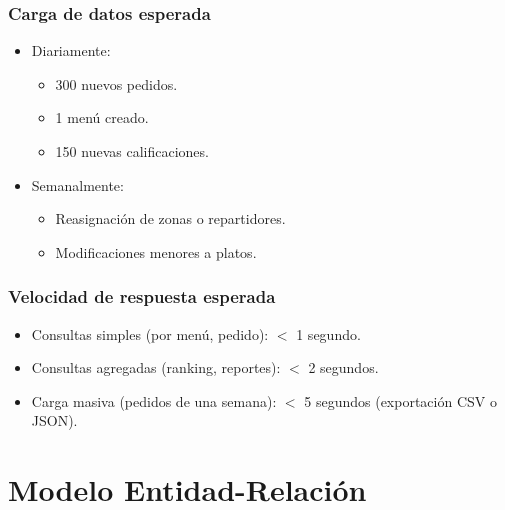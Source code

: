 \documentclass[12pt,a4paper]{article}
\begin{document}
\subsubsection{Carga de datos esperada}
\begin{itemize}
  \item Diariamente:
    \begin{itemize}
      \item 300 nuevos pedidos.
      \item 1 menú creado.
      \item 150 nuevas calificaciones.
    \end{itemize}
  \item Semanalmente:
    \begin{itemize}
      \item Reasignación de zonas o repartidores.
      \item Modificaciones menores a platos.
    \end{itemize}
\end{itemize}

\subsubsection{Velocidad de respuesta esperada}
\begin{itemize}
  \item Consultas simples (por menú, pedido): $<$ 1 segundo.
  \item Consultas agregadas (ranking, reportes): $<$ 2 segundos.
  \item Carga masiva (pedidos de una semana): $<$ 5 segundos (exportación CSV o JSON).
\end{itemize}



\section{Modelo Entidad-Relación}
\end{document}

